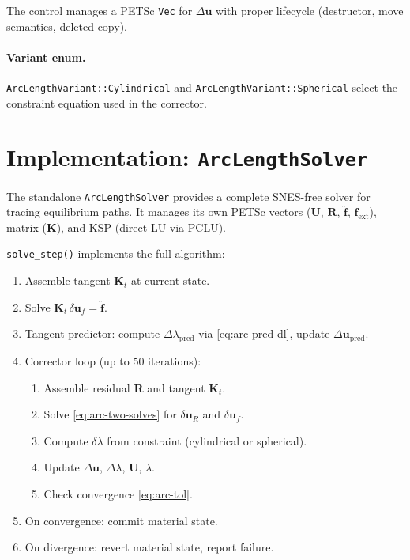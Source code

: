 The control manages a PETSc \texttt{Vec} for $\Delta\mathbf{u}$ with
proper lifecycle (destructor, move semantics, deleted copy).

\paragraph{Variant enum.}
\texttt{ArcLengthVariant::Cylindrical} and
\texttt{ArcLengthVariant::Spherical} select the constraint equation
used in the corrector.


\section{Implementation: \texttt{ArcLengthSolver}}
\label{sec:arc-solver-impl}

The standalone \texttt{ArcLengthSolver} provides a complete
SNES-free solver for tracing equilibrium paths.  It manages its own
PETSc vectors ($\mathbf{U}$, $\mathbf{R}$, $\hat{\mathbf{f}}$,
$\mathbf{f}_{\text{ext}}$), matrix ($\mathbf{K}$), and KSP (direct
LU via PCLU).

\texttt{solve\_step()} implements the full algorithm:
\begin{enumerate}
  \item Assemble tangent $\mathbf{K}_t$ at current state.
  \item Solve $\mathbf{K}_t \, \delta\mathbf{u}_f = \hat{\mathbf{f}}$.
  \item Tangent predictor: compute $\Delta\lambda_{\text{pred}}$
    via \eqref{eq:arc-pred-dl}, update
    $\Delta\mathbf{u}_{\text{pred}}$.
  \item Corrector loop (up to 50 iterations):
    \begin{enumerate}
      \item Assemble residual $\mathbf{R}$ and tangent $\mathbf{K}_t$.
      \item Solve \eqref{eq:arc-two-solves} for
        $\delta\mathbf{u}_R$ and $\delta\mathbf{u}_f$.
      \item Compute $\delta\lambda$ from constraint
        (cylindrical or spherical).
      \item Update $\Delta\mathbf{u}$, $\Delta\lambda$,
        $\mathbf{U}$, $\lambda$.
      \item Check convergence \eqref{eq:arc-tol}.
    \end{enumerate}
  \item On convergence: commit material state.
  \item On divergence: revert material state, report failure.
\end{enumerate}

